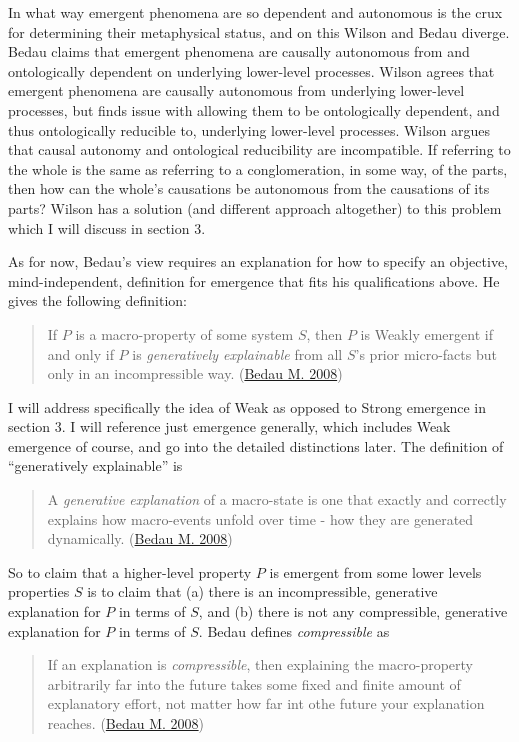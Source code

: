 \documentclass{article}
\newcommand{\ti}[1]{\textit{#1}}
\renewcommand{\cite}[1]{\hyperlink{#1}{#1}}
\begin{document}
In what way emergent phenomena are so dependent and autonomous is the crux for determining their metaphysical status, and on this Wilson and Bedau diverge. Bedau claims that emergent phenomena are causally autonomous from and ontologically dependent on underlying lower-level processes. Wilson agrees that emergent phenomena are causally autonomous from underlying lower-level processes, but finds issue with allowing them to be ontologically dependent, and thus ontologically reducible to, underlying lower-level processes. Wilson argues that causal autonomy and ontological reducibility are incompatible. If referring to the whole is the same as referring to a conglomeration, in some way, of the parts, then how can the whole's causations be autonomous from the causations of its parts? Wilson has a solution (and different approach altogether) to this problem which I will discuss in section 3.

As for now, Bedau's view requires an explanation for how to specify an objective, mind-independent, definition for emergence that fits his qualifications above. He gives the following definition:

\begin{quote}
If $P$ is a macro-property of some system $S$, then $P$ is Weakly emergent if and only if $P$ is \ti{generatively explainable} from all $S$'s prior micro-facts but only in an incompressible way.
(\cite{Bedau M. 2008})
\end{quote}

I will address specifically the idea of Weak as opposed to Strong emergence in section 3. 
I will reference just emergence generally, which includes Weak emergence of course, and go into the detailed distinctions later. The definition of ``generatively explainable'' is

\begin{quote}
A \ti{generative explanation} of a macro-state is one that exactly and correctly explains how macro-events unfold over time - how they are generated dynamically.
(\cite{Bedau M. 2008})
\end{quote}

So to claim that a higher-level property $P$ is emergent from some lower levels properties $S$ is to claim that (a) there is an incompressible, generative explanation for $P$ in terms of $S$, and (b) there is not any compressible, generative explanation for $P$ in terms of $S$. Bedau defines \ti{compressible} as

\begin{quote}
If an explanation is \ti{compressible}, then explaining the macro-property arbitrarily far into the future takes some fixed and finite amount of explanatory effort, not matter how far int othe future your explanation reaches.
(\cite{Bedau M. 2008})
\end{quote}
\end{document}
